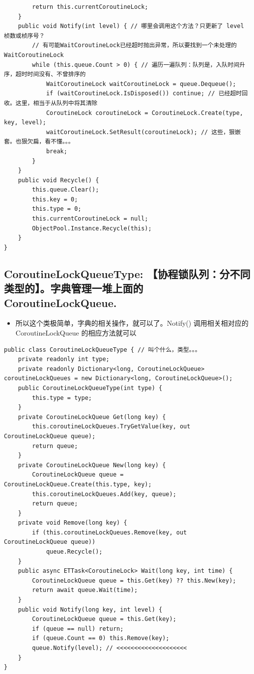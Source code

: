 \documentclass[9pt, b5paper]{article}
\begin{document}
\begin{verbatim}
        return this.currentCoroutineLock;
    }
    public void Notify(int level) { // 哪里会调用这个方法？只更新了 level 桢数或桢序号？
        // 有可能WaitCoroutineLock已经超时抛出异常，所以要找到一个未处理的WaitCoroutineLock
        while (this.queue.Count > 0) { // 遍历一遍队列：队列是，入队时间升序，超时时间没有、不曾排序的
            WaitCoroutineLock waitCoroutineLock = queue.Dequeue();
            if (waitCoroutineLock.IsDisposed()) continue; // 已经超时回收。这里，相当于从队列中将其清除
            CoroutineLock coroutineLock = CoroutineLock.Create(type, key, level);
            waitCoroutineLock.SetResult(coroutineLock); // 这些，狠嵌套。也狠欠扁，看不懂。。。
            break;
        }
    }
    public void Recycle() {
        this.queue.Clear();
        this.key = 0;
        this.type = 0;
        this.currentCoroutineLock = null;
        ObjectPool.Instance.Recycle(this);
    }
}
\end{verbatim}
\subsection{CoroutineLockQueueType: 【协程锁队列：分不同类型的】。字典管理一堆上面的 CoroutineLockQueue.}
\label{sec-14-5}
\begin{itemize}
\item 所以这个类极简单，字典的相关操作，就可以了。Notify() 调用相关相对应的CoroutineLockQueue 的相应方法就可以
\end{itemize}
\begin{verbatim}
public class CoroutineLockQueueType { // 叫个什么，类型。。。
    private readonly int type;
    private readonly Dictionary<long, CoroutineLockQueue> coroutineLockQueues = new Dictionary<long, CoroutineLockQueue>();
    public CoroutineLockQueueType(int type) {
        this.type = type;
    }
    private CoroutineLockQueue Get(long key) {
        this.coroutineLockQueues.TryGetValue(key, out CoroutineLockQueue queue);
        return queue;
    }
    private CoroutineLockQueue New(long key) {
        CoroutineLockQueue queue = CoroutineLockQueue.Create(this.type, key);
        this.coroutineLockQueues.Add(key, queue);
        return queue;
    }
    private void Remove(long key) {
        if (this.coroutineLockQueues.Remove(key, out CoroutineLockQueue queue)) 
            queue.Recycle();
    }
    public async ETTask<CoroutineLock> Wait(long key, int time) {
        CoroutineLockQueue queue = this.Get(key) ?? this.New(key);
        return await queue.Wait(time);
    }
    public void Notify(long key, int level) {
        CoroutineLockQueue queue = this.Get(key);
        if (queue == null) return;
        if (queue.Count == 0) this.Remove(key);
        queue.Notify(level); // <<<<<<<<<<<<<<<<<<<< 
    }
}
\end{verbatim}
\end{document}
